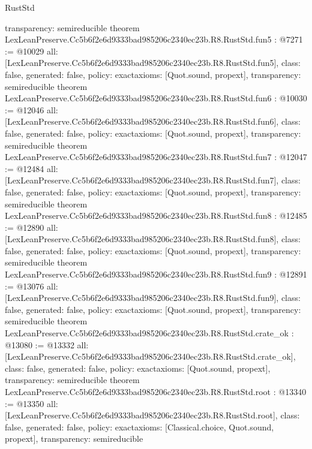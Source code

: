 \begin{lexlean}{RustStd}
\begin{coremodule}
{  transparency: semireducible
}
theorem LexLeanPreserve.Cc5b6f2e6d9333bad985206c2340ec23b.R8.RustStd.fun5 : @7271 := @10029 {
  all: [LexLeanPreserve.Cc5b6f2e6d9333bad985206c2340ec23b.R8.RustStd.fun5],
  class: false,
  generated: false,
  policy: exact{axioms: [Quot.sound, propext]},
  transparency: semireducible
}
theorem LexLeanPreserve.Cc5b6f2e6d9333bad985206c2340ec23b.R8.RustStd.fun6 : @10030 := @12046 {
  all: [LexLeanPreserve.Cc5b6f2e6d9333bad985206c2340ec23b.R8.RustStd.fun6],
  class: false,
  generated: false,
  policy: exact{axioms: [Quot.sound, propext]},
  transparency: semireducible
}
theorem LexLeanPreserve.Cc5b6f2e6d9333bad985206c2340ec23b.R8.RustStd.fun7 : @12047 := @12484 {
  all: [LexLeanPreserve.Cc5b6f2e6d9333bad985206c2340ec23b.R8.RustStd.fun7],
  class: false,
  generated: false,
  policy: exact{axioms: [Quot.sound, propext]},
  transparency: semireducible
}
theorem LexLeanPreserve.Cc5b6f2e6d9333bad985206c2340ec23b.R8.RustStd.fun8 : @12485 := @12890 {
  all: [LexLeanPreserve.Cc5b6f2e6d9333bad985206c2340ec23b.R8.RustStd.fun8],
  class: false,
  generated: false,
  policy: exact{axioms: [Quot.sound, propext]},
  transparency: semireducible
}
theorem LexLeanPreserve.Cc5b6f2e6d9333bad985206c2340ec23b.R8.RustStd.fun9 : @12891 := @13076 {
  all: [LexLeanPreserve.Cc5b6f2e6d9333bad985206c2340ec23b.R8.RustStd.fun9],
  class: false,
  generated: false,
  policy: exact{axioms: [Quot.sound, propext]},
  transparency: semireducible
}
theorem LexLeanPreserve.Cc5b6f2e6d9333bad985206c2340ec23b.R8.RustStd.crate_ok : @13080 := @13332 {
  all: [LexLeanPreserve.Cc5b6f2e6d9333bad985206c2340ec23b.R8.RustStd.crate_ok],
  class: false,
  generated: false,
  policy: exact{axioms: [Quot.sound, propext]},
  transparency: semireducible
}
theorem LexLeanPreserve.Cc5b6f2e6d9333bad985206c2340ec23b.R8.RustStd.root : @13340 := @13350 {
  all: [LexLeanPreserve.Cc5b6f2e6d9333bad985206c2340ec23b.R8.RustStd.root],
  class: false,
  generated: false,
  policy: exact{axioms: [Classical.choice, Quot.sound, propext]},
  transparency: semireducible
}


\end{coremodule}
\end{lexlean}

